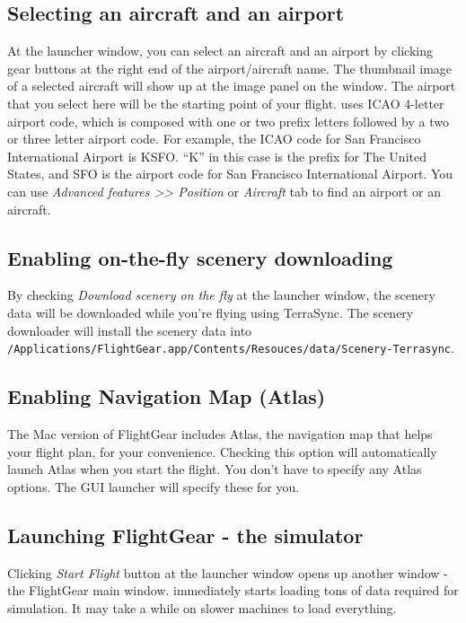 \medskip

\subsection{Selecting an aircraft and an airport}
At the launcher window, you can select an aircraft and an airport by clicking gear buttons at the right end of the airport/aircraft name. The thumbnail image of a selected aircraft will show up at the image panel on the window. The airport that you select here will be the starting point of your flight. \FlightGear{} uses ICAO 4-letter airport code, which is composed with one or two prefix letters followed by a two or three letter airport code. For example, the ICAO code for San Francisco International Airport is KSFO. ``K'' in this case is the prefix for The United States, and SFO is the airport code for San Francisco International Airport. You can use \textit{Advanced features >> Position} or \textit{Aircraft} tab to find an airport or an aircraft.

\subsection{Enabling on-the-fly scenery downloading}
By checking \textit{Download scenery on the fly} at the launcher window, the scenery data will be downloaded while you're flying using TerraSync. The scenery downloader will install the scenery data into \\
\texttt{/Applications/FlightGear.app/Contents/Resouces/data/Scenery-Terrasync}. 

\subsection{Enabling Navigation Map (Atlas)}
The Mac version of FlightGear includes Atlas, the navigation map that helps your flight plan, for your convenience. Checking this option will automatically launch Atlas when you start the flight. You don't have to specify any Atlas options. The GUI launcher will specify these for you.

\subsection{Launching FlightGear - the simulator}
Clicking \textit{Start Flight} button at the launcher window opens up another window - the FlightGear main window. \FlightGear{} immediately starts loading tons of data required for simulation. It may take a while on slower machines to load everything.

